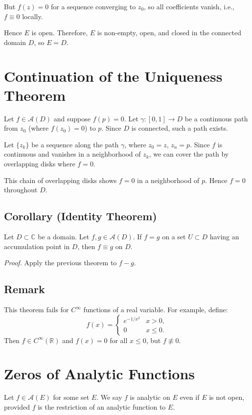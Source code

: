 \documentclass[12pt]{article}
\theoremstyle{definition} %
\theoremstyle{plain} %
\begin{document}
But $f(z) = 0$ for a sequence converging to $z_0$, so all coefficients vanish, i.e., $f \equiv 0$ locally.

Hence $E$ is open. Therefore, $E$ is non-empty, open, and closed in the connected domain $D$, so $E = D$.
\section*{Continuation of the Uniqueness Theorem}

Let $f \in \mathcal{A}(D)$ and suppose $f(p) = 0$. Let $\gamma : [0,1] \to D$ be a continuous path from $z_0$ (where $f(z_0) = 0$) to $p$. Since $D$ is connected, such a path exists.

Let $\{z_k\}$ be a sequence along the path $\gamma$, where $z_0 = z$, $z_n = p$. Since $f$ is continuous and vanishes in a neighborhood of $z_k$, we can cover the path by overlapping disks where $f = 0$.

This chain of overlapping disks shows $f = 0$ in a neighborhood of $p$. Hence $f = 0$ throughout $D$.

\subsection*{Corollary (Identity Theorem)}

Let $D \subset \mathbb{C}$ be a domain. Let $f, g \in \mathcal{A}(D)$. If $f = g$ on a set $U \subset D$ having an accumulation point in $D$, then $f \equiv g$ on $D$.

\textit{Proof.} Apply the previous theorem to $f - g$.

\subsection*{Remark}

This theorem fails for $C^\infty$ functions of a real variable. For example, define:
\[
f(x) = 
\begin{cases}
e^{-1/x^2} & x > 0, \\
0 & x \leq 0.
\end{cases}
\]
Then $f \in C^\infty(\mathbb{R})$ and $f(x) = 0$ for all $x \leq 0$, but $f \not\equiv 0$.

\section*{Zeros of Analytic Functions}

Let $f \in \mathcal{A}(E)$ for some set $E$. We say $f$ is analytic on $E$ even if $E$ is not open, provided $f$ is the restriction of an analytic function to $E$.
\end{document}
